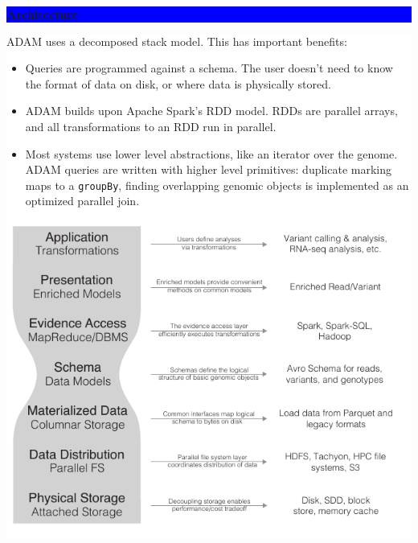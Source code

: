 \documentclass[11pt]{a0poster}
\begin{document}
{\begin{minipage}[t][2045pt][t]{\linewidth}
\begin{minipage}{0.6\linewidth}
\vspace{70pt}
\colorbox{Blue}{
\begin{minipage}[t]{\linewidth}
\vspace{30pt}
\begin{center}
\Huge \bf \color{White} Architecture
\end{center}
\vspace{17pt}
\end{minipage}
}
\colorbox{White}{
\begin{minipage}[t][1000pt][t]{\linewidth}
\begin{minipage}{0.005\linewidth}
\hfill
\pagebreak
\end{minipage}
\begin{minipage}{0.32\linewidth}
\vspace{10pt}
\LARGE
\color{Blue}
ADAM uses a decomposed stack model. This has important benefits:
\begin{itemize}
\item Queries are programmed against a schema. The user doesn't need to know the
format of data on disk, or where data is physically stored.
\item ADAM builds upon Apache Spark's RDD model. RDDs are parallel arrays,
and all transformations to an RDD run in parallel.
\item Most systems use lower level abstractions, like an iterator over the genome.
ADAM queries are written with higher level primitives: duplicate marking maps to
a \texttt{groupBy}, finding overlapping genomic objects is implemented as an
optimized parallel join.
\end{itemize}
\end{minipage}
\begin{minipage}{0.005\linewidth}
\hfill
\pagebreak
\end{minipage}
\begin{minipage}{0.64\linewidth}
\vspace{30pt}
\hspace{100pt}
\includegraphics[width=0.95\linewidth]{expanded-stack-2.pdf}
\end{minipage}
\pagebreak
\end{minipage}
}


\end{minipage}
\end{minipage}}
\end{document}
